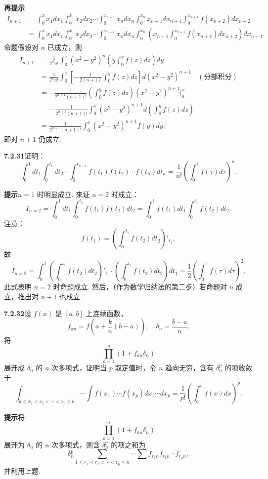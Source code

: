 \documentclass[UTF8, 12pt, fontset=fandol, oneside]{ctexart}
\begin{document}
\noindent\textbf{再提示}\quad
\[
\begin{aligned}
I_{n+1}
&=\int_0^x x_1dx_1\int_0^{x_1}x_2dx_2\cdots
\int_0^{x_{n-1}}x_ndx_n\int_0^{x_n}x_{n+1}dx_{n+1}
\int_0^{x_{n+1}}f(x_{n+2})dx_{n+2}\\
&=\int_0^x x_1dx_1\int_0^{x_1}x_2dx_2\cdots
\int_0^{x_{n-1}}x_ndx_n\int_0^{x_n}
\left(x_{n+1}\int_0^{x_{n+1}}f(x_{n+2})dx_{n+2}\right)dx_{n+1}.
\end{aligned}
\]
命题假设对 $n$ 已成立，则
\[
\begin{aligned}
I_{n+1}
&=\frac1{2^nn!}\int_0^x(x^2-y^2)^n
\left(y\int_0^yf(z)dz\right)dy\\
&=\frac1{2^nn!}\int_0^x
\left[-\frac1{2(n+1)}\int_0^yf(z)dz\right]d(x^2-y^2)^{n+1}
\quad(\text{分部积分})\\
&=-\frac1{2^{n+1}(n+1)!}
\left(\int_0^yf(z)dz\right)(x^2-y^2)^{n+1}\Big|_0^x\\
&\quad-\frac1{2^{n+1}(n+1)!}
\int_0^x(x^2-y^2)^{n+1}d\left(\int_0^yf(z)dz\right)\\
&=\frac1{2^{n+1}(n+1)!}\int_0^x(x^2-y^2)^{n+1}f(y)dy,
\end{aligned}
\]
即对 $n+1$ 仍成立.

\noindent\textbf{7.2.31}\quad 证明：
\[
\int_0^1dt_1\int_0^{t_1}dt_2\cdots\int_0^{t_{n-1}}
f(t_1)f(t_2)\cdots f(t_n)dt_n
=\frac1{n!}\left(\int_0^1f(\tau)d\tau\right)^n.
\]

\noindent\textbf{提示}\quad $n=1$ 时明显成立. 来证 $n=2$ 时成立：
\[
I_{n=2}=\int_0^1dt_1\int_0^{t_1}f(t_1)f(t_2)dt_2
=\int_0^1f(t_1)dt_1\int_0^{t_1}f(t_2)dt_2.
\]
注意：
\[
f(t_1)=\left(\int_0^{t_1}f(t_2)dt_2\right)'_{t_1},
\]
故
\[
I_{n=2}=\int_0^1\left(\int_0^{t_1}f(t_2)dt_2\right)'_{t_1}
\cdot\left(\int_0^{t_1}f(t_2)dt_2\right)dt_1
=\frac12\left(\int_0^1f(\tau)d\tau\right)^2.
\]
此式表明 $n=2$ 时命题成立. 然后，（作为数学归纳法的第二步）若命题对 $n$ 成立，推出对 $n+1$ 也成立.

\noindent\textbf{7.2.32}\quad 设 $f(x)$ 是 $[a,b]$ 上连续函数，
\[
f_{kn}=f\left(a+\frac kn(b-a)\right),\quad
\delta_n=\frac{b-a}{n}.
\]
将
\[
\prod_{k=1}^n(1+f_{kn}\delta_n)
\]
展开成 $\delta_n$ 的 $n$ 次多项式，证明当 $p$ 取定值时，令 $n$ 趋向无穷，含有 $\delta_n^p$ 的项收敛于
\[
\int_{a\le x_1<x_2<\cdots<x_p\le b}\cdots\int
f(x_1)\cdots f(x_p)dx_1\cdots dx_p
=\frac1{p!}\left(\int_a^bf(x)dx\right)^p.
\]

\noindent\textbf{提示}\quad 将
\[
\prod_{k=1}^n(1+f_{kn}\delta_n)
\]
展开为 $\delta_n$ 的 $n$ 次多项式，则含 $\delta_n^p$ 的项之和为
\[
\delta_n^p\sum_{1\le r_1<r_2<\cdots<r_p\le n}\cdots\sum
f_{r_1n}f_{r_2n}\cdots f_{r_pn},
\]
并利用上题.
\end{document}
